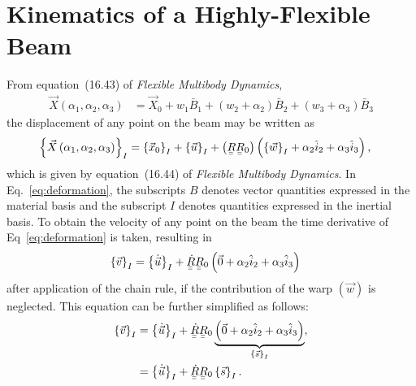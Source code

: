\documentclass[a4paper]{article}
\newcommand{\ubar}[1]{\underaccent{\bar}{#1}}
\begin{document}
\section*{Kinematics of a Highly-Flexible Beam}

From equation~(16.43) of \textit{Flexible Multibody Dynamics}, \begin{align}
  \vec{X}\left( \alpha_{1}, \alpha_{2}, \alpha_{3} \right)  
  &= \vec{X}_{0} + w_{1}\bar{B}_{1} + \left( w_{2} + \alpha_{2} \right)\bar{B}_{2}
  + \left( w_{3} + \alpha_{3} \right)\bar{B}_{3}
  \label{eq:1643}
\end{align}
the displacement of any point on the beam may be written as 
\begin{align}
  \left\{ \vec{X}\left( \alpha_{1}, \alpha_{2}, \alpha_{3} \right) \right\}_{I}  
  &= \left\{ \vec{x}_{0} \right\}_{I} 
  + \left\{ \vec{u} \right\}_{I} 
  + \left( \ubar{\ubar{R}} \ubar{\ubar{R}}_{0} \right) 
  \left( \left\{ \vec{w} \right\}_{I} + \alpha_{2} \hat{i}_{2} + \alpha_{3} \hat{i}_{3} \right),
  \label{eq:deformation}
\end{align}
which is given by equation~(16.44) of \textit{Flexible Multibody Dynamics}.  In Eq.~\eqref{eq:deformation}, the subscripts $B$ denotes vector quantities expressed in the material basis and the subscript $I$ denotes quantities expressed in the inertial basis.  To obtain the velocity of any point on the beam the time derivative of Eq~\eqref{eq:deformation} is taken, resulting in
% 
\begin{align}
  \left\{ \vec{v} \right\}_{I} 
  &= \left\{ \dot{ \vec{u}}\right\}_{I} 
  + \ubar{\ubar{\dot{R}}}\ubar{\ubar{R}}_{0} 
  \left( \vec{0} + \alpha_{2} \hat{i}_{2} + \alpha_{3} \hat{i}_{3} \right) 
\end{align}
after application of the chain rule, if the contribution of the warp $\left( \vec{w} \right)$ is neglected.
This equation can be further simplified as follows: 
\begin{align}
  \left\{ \vec{v} \right\}_{I}  
  &= \left\{ \dot{ \vec{u}}\right\}_{I} 
  +  \ubar{\ubar{\dot{R}}} \ubar{\ubar{R}}_{0} 
  \underbrace{\left( \vec{0} + \alpha_{2} \hat{i}_{2} 
  + \alpha_{3} \hat{i}_{3} \right)}_{\left\{ \vec{s} \right\}_{I}}, \\
  &=  \left\{ \dot{ \vec{u}}\right\}_{I} 
  +  \ubar{\ubar{\dot{R}}} \ubar{\ubar{R}}_{0} \left\{ \vec{s} \right\}_{I}.
  \label{eq:velocity1}
\end{align}
\end{document}
